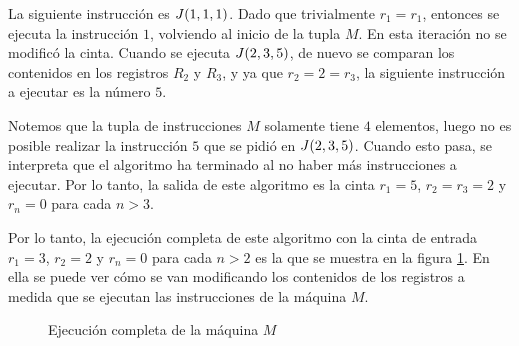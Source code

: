 La siguiente instrucción es $J\pa*{1, 1, 1}$. Dado que trivialmente $r_{1} = r_{1}$, entonces se ejecuta la instrucción $1$, volviendo al inicio de la tupla $M$. En esta iteración no se modificó la cinta. Cuando se ejecuta $J\pa*{2, 3, 5}$, de nuevo se comparan los contenidos en los registros $R_{2}$ y $R_{3}$, y ya que $r_{2} = 2 = r_{3}$, la siguiente instrucción a ejecutar es la número $5$.

Notemos que la tupla de instrucciones $M$ solamente tiene $4$ elementos, luego no es posible realizar la instrucción $5$ que se pidió en $J\pa*{2, 3, 5}$. Cuando esto pasa, se interpreta que el algoritmo ha terminado al no haber más instrucciones a ejecutar. Por lo tanto, la salida de este algoritmo es la cinta $r_{1} = 5$, $r_{2} = r_{3} = 2$ y $r_{n} = 0$ para cada $n > 3$.

Por lo tanto, la ejecución completa de este algoritmo con la cinta de entrada $r_{1} = 3$, $r_{2} = 2$ y $r_{n} = 0$ para cada $n > 2$ es la que se muestra en la figura \ref{fig:ejecucion_completa_M}. En ella se puede ver cómo se van modificando los contenidos de los registros a medida que se ejecutan las instrucciones de la máquina $M$.

\begin{figure}[h!]
	\centering


	\caption{Ejecución completa de la máquina $M$}
	\label{fig:ejecucion_completa_M}
\end{figure}

